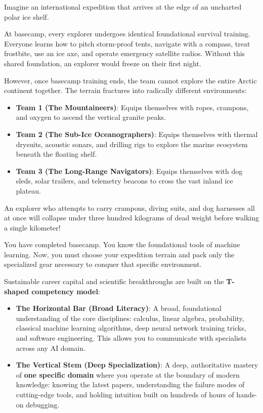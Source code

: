 \begin{analogy}
Imagine an international expedition that arrives at the edge of an uncharted polar ice shelf.

At basecamp, every explorer undergoes identical foundational survival training. Everyone learns how to pitch storm-proof tents, navigate with a compass, treat frostbite, use an ice axe, and operate emergency satellite radios. Without this shared foundation, an explorer would freeze on their first night.

However, once basecamp training ends, the team cannot explore the entire Arctic continent together. The terrain fractures into radically different environments:
\begin{itemize}
    \item \textbf{Team 1 (The Mountaineers)}: Equips themselves with ropes, crampons, and oxygen to ascend the vertical granite peaks.
    \item \textbf{Team 2 (The Sub-Ice Oceanographers)}: Equips themselves with thermal drysuits, acoustic sonars, and drilling rigs to explore the marine ecosystem beneath the floating shelf.
    \item \textbf{Team 3 (The Long-Range Navigators)}: Equips themselves with dog sleds, solar trailers, and telemetry beacons to cross the vast inland ice plateau.
\end{itemize}

An explorer who attempts to carry crampons, diving suits, and dog harnesses all at once will collapse under three hundred kilograms of dead weight before walking a single kilometer! 

You have completed basecamp. You know the foundational tools of machine learning. Now, you must choose your expedition terrain and pack only the specialized gear necessary to conquer that specific environment.
\end{analogy}

\begin{keyidea}
Sustainable career capital and scientific breakthroughs are built on the \textbf{T-shaped competency model}:
\begin{itemize}
    \item \textbf{The Horizontal Bar (Broad Literacy)}: A broad, foundational understanding of the core disciplines: calculus, linear algebra, probability, classical machine learning algorithms, deep neural network training tricks, and software engineering. This allows you to communicate with specialists across any AI domain.
    \item \textbf{The Vertical Stem (Deep Specialization)}: A deep, authoritative mastery of \textbf{one specific domain} where you operate at the boundary of modern knowledge: knowing the latest papers, understanding the failure modes of cutting-edge tools, and holding intuition built on hundreds of hours of hands-on debugging.
\end{itemize}
\end{keyidea}

